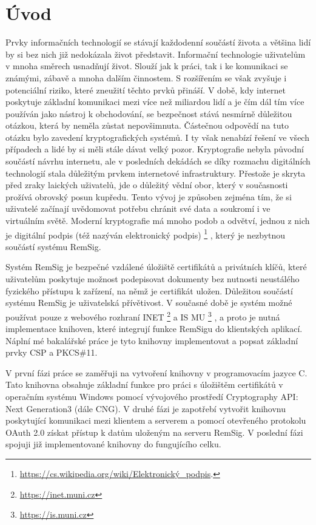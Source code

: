 \documentclass[]{fithesis3}
\begin{document}
\chapter{Úvod}

Prvky informačních technologií se stávají každodenní součástí života a většina lidí by si bez nich již nedokázala život představit. Informační technologie uživatelům v mnoha směrech usnadňují život. Slouží jak k práci, tak i ke komunikaci se známými, zábavě a mnoha dalším činnostem. S rozšířením se však zvyšuje i potenciální riziko, které zneužití těchto prvků přináší. V době, kdy internet poskytuje základní komunikaci mezi více než miliardou lidí a je čím dál tím více používán jako nástroj k obchodování, se bezpečnost stává nesmírně důležitou otázkou, která by neměla zůstat nepovšimnuta. Částečnou odpovědí na tuto otázku bylo zavedení kryptografických systémů. I ty však nenabízí řešení ve všech případech a lidé by si měli stále dávat velký pozor. Kryptografie nebyla původní součástí návrhu internetu, ale v posledních dekádách se díky rozmachu digitálních technologií stala důležitým prvkem internetové infrastruktury. Přestože je skryta před zraky laických uživatelů, jde o důležitý vědní obor, který v současnosti prožívá obrovský posun kupředu. Tento vývoj je způsoben zejména tím, že si uživatelé začínají uvědomovat potřebu chránit své data a soukromí i ve virtuálním světě. Moderní kryptografie má mnoho podob a odvětví, jednou z nich je digitální podpis (též nazýván elektronický podpis)
\footnote{
	\href{https://cs.wikipedia.org/wiki/Elektronick\%C3\%BD_podpis}{https://cs.wikipedia.org/wiki/Elektronický\_podpis}.
}
, který je nezbytnou součástí systému RemSig.

Systém RemSig je bezpečné vzdálené úložiště certifikátů a privátních klíčů, které uživatelům poskytuje možnost podepisovat dokumenty bez nutnosti neustálého fyzického přístupu k zařízení, na němž je certifikát uložen. Důležitou součástí systému RemSig je uživatelská přívětivost. V současné době je systém možné používat pouze z webového rozhraní INET
\footnote{\url{https://inet.muni.cz}} 
a IS MU
\footnote{\url{https://is.muni.cz}}
, a proto je nutná implementace knihoven, které integrují funkce RemSigu do klientských aplikací. Náplní mé bakalářské práce je tyto knihovny implementovat a popsat základní prvky CSP a PKCS\#11. 

V první fázi práce se zaměřuji na vytvoření knihovny v programovacím jazyce C. Tato knihovna obsahuje základní funkce pro práci s úložištěm certifikátů v operačním systému Windows pomocí vývojového prostředí Cryptography API: Next Generation3 (dále CNG). V druhé fázi je zapotřebí vytvořit knihovnu poskytující komunikaci mezi klientem a serverem a pomocí otevřeného protokolu OAuth 2.0 získat přístup k datům uloženým na serveru RemSig. V poslední fázi spojuji již implementované knihovny do fungujícího celku.
\end{document}
